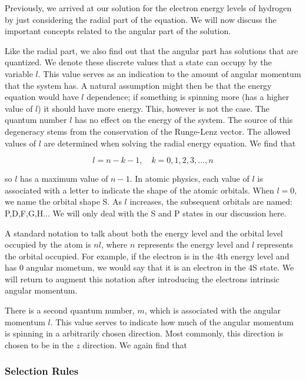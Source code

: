 \documentclass[letter,12pt]{article}
\begin{document}
        Previously, we arrived at our solution for the electron energy 
		levels
        of hydrogen by just considering the radial part of the
        equation. We will now discuss the important concepts related
        to the angular part of the solution. 
        
        Like the radial part, 
        we also find out that the angular part has solutions that 
        are quantized. We denote these discrete values that a state
		can occupy by the variable $l$. This value serves as an
		indication to the amount of angular momentum that the 
		system has. A natural assumption might then be that
		the energy equation would have $l$ dependence; if 
		something is spinning more (has a higher value 
		of $l$) it should have more energy. This, however is not
		the case. The quantum number $l$ has no effect on the 
		energy of the system. The source of this degeneracy stems from 
		the conservation of the Runge-Lenz vector.
		The allowed values of $l$ are determined when solving
		the radial energy equation. We find that

		\begin{equation}
			l=n-k-1,\quad k=0,1,2,3,...,n
		\end{equation}

		so $l$ has a maximum value of $n-1$. In atomic physics, 
		each value of $l$ is associated with a letter to indicate
		the shape of the atomic orbitals. When $l=0$, we name the 
		orbital shape S. As $l$ increases, the subsequent orbitals
		are named: P,D,F,G,H... We will only deal with the S and P 
		states in our discussion here. 

		A standard notation to talk about both the energy level and
		the orbital level occupied by the atom is $nl$, where $n$
		represents the energy level and $l$ represents the orbital
		occupied. For example, if the electron is in the 4th energy
		level and has 0 angular mometum, we would say that it is
		an electron in the 4S state. We will return to augment this 
		notation after introducing the electrons intrinsic angular
		momentum.

		There is a second quantum number, $m$, which is associated 
		with the angular momentum $l$. This value serves to indicate
		how much of the angular momentum is spinning in a arbitrarily
		chosen direction. Most commonly, this direction is chosen
		to be in the $z$ direction. We again find that 

		\subsubsection{Selection Rules}\label{selectionRules}
\end{document}
